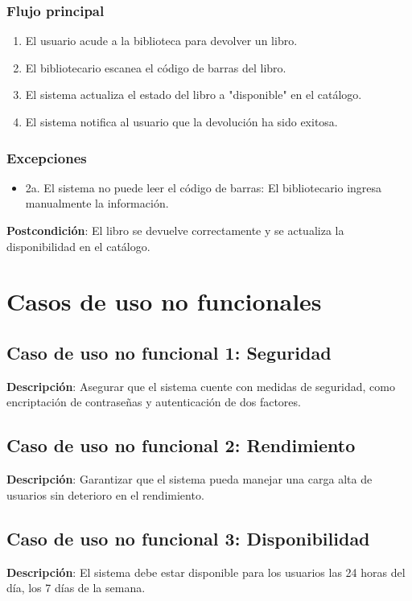 \documentclass{scrreprt}
\begin{document}
\subsubsection{Flujo principal}
\begin{enumerate}
    \item El usuario acude a la biblioteca para devolver un libro.
    \item El bibliotecario escanea el código de barras del libro.
    \item El sistema actualiza el estado del libro a "disponible" en el catálogo.
    \item El sistema notifica al usuario que la devolución ha sido exitosa.
\end{enumerate}

\subsubsection{Excepciones}
\begin{itemize}
    \item 2a. El sistema no puede leer el código de barras: El bibliotecario ingresa manualmente la información.
\end{itemize}

\textbf{Postcondición}: El libro se devuelve correctamente y se actualiza la disponibilidad en el catálogo.

\section{Casos de uso no funcionales}

\subsection{Caso de uso no funcional 1: Seguridad}
\textbf{Descripción}: Asegurar que el sistema cuente con medidas de seguridad, como encriptación de contraseñas y autenticación de dos factores.

\subsection{Caso de uso no funcional 2: Rendimiento}
\textbf{Descripción}: Garantizar que el sistema pueda manejar una carga alta de usuarios sin deterioro en el rendimiento.

\subsection{Caso de uso no funcional 3: Disponibilidad}
\textbf{Descripción}: El sistema debe estar disponible para los usuarios las 24 horas del día, los 7 días de la semana.
\end{document}
